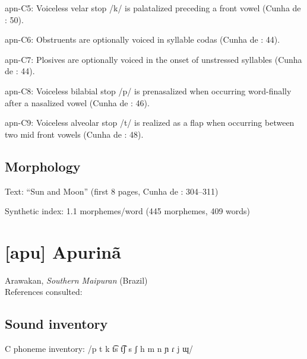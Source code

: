 {\begin{appendixdesc}
\item[apn-C5:] Voiceless velar stop /k/ is palatalized preceding a front vowel (Cunha de \citealt{Oliveira2005}: 50).

\item[apn-C6:] Obstruents are optionally voiced in syllable codas (Cunha de \citealt{Oliveira2005}: 44).

\item[apn-C7:] Plosives are optionally voiced in the onset of unstressed syllables (Cunha de \citealt{Oliveira2005}: 44).

\item[apn-C8:] Voiceless bilabial stop /p/ is prenasalized when occurring word-finally after a nasalized vowel (Cunha de \citealt{Oliveira2005}: 46).

\item[apn-C9:] Voiceless alveolar stop /t/ is realized as a flap when occurring between two mid front vowels (Cunha de \citealt{Oliveira2005}: 48).
\end{appendixdesc}
\subsection*{Morphology}

\begin{appendixdesc}

\item[Text:] “Sun and Moon” (first 8 pages, Cunha de \citealt{Oliveira2005}: 304--311)

\item[Synthetic index:] 1.1 morphemes/word (445 morphemes, 409 words)
\end{appendixdesc}

\section*{[apu] Apurinã}   %
Arawakan, \textit{Southern Maipuran} (Brazil)\medskip\\
References consulted: \citet{Facundes2000}

\subsection*{Sound inventory}
\begin{appendixdesc}

\item[C phoneme inventory:] /p t k t͡s t͡ʃ s ʃ h m n ɲ ɾ j ɰ/


\end{appendixdesc}}

